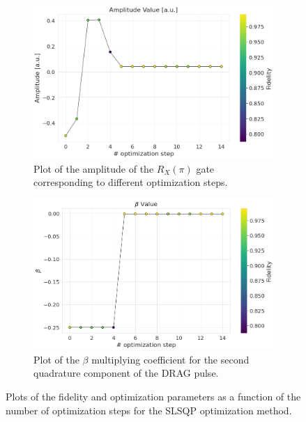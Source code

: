 \begin{figure}[h]
    \begin{subfigure}[t]{0.495\textwidth}
        \includegraphics[width=\textwidth]{figures/png/RB_optimization/SLSQP/amplitude.png}
        \caption{Plot of the amplitude of the $R_X(\pi)$ gate corresponding to different optimization steps.}
        \label{fig:SLSQP:amplitude}
    \end{subfigure}
    \hfill
    \begin{subfigure}[t]{0.495\textwidth}
        \includegraphics[width=\textwidth]{figures/png/RB_optimization/SLSQP/beta.png}
        \caption{Plot of the $\beta$ multiplying coefficient for the second quadrature component of the DRAG pulse.}
        \label{fig:SLSQP:beta}
    \end{subfigure}

    \caption{Plots of the fidelity and optimization parameters as a function of the number of optimization steps for the SLSQP optimization method.}
    \label{fig:SLSQP_plots}
\end{figure}

